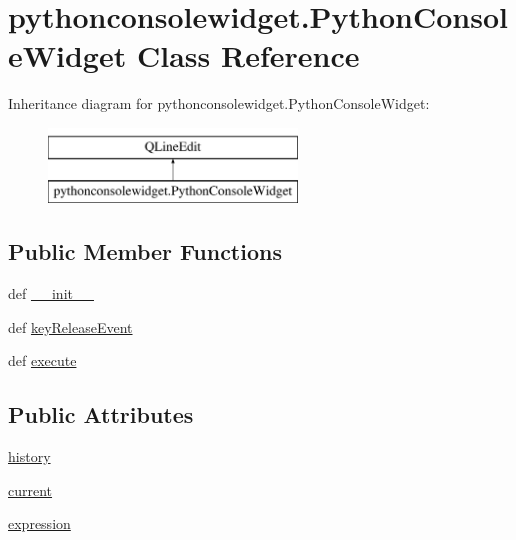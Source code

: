 \hypertarget{classpythonconsolewidget_1_1PythonConsoleWidget}{}\section{pythonconsolewidget.\+Python\+Console\+Widget Class Reference}
\label{classpythonconsolewidget_1_1PythonConsoleWidget}
Inheritance diagram for pythonconsolewidget.\+Python\+Console\+Widget\+:\begin{figure}[H]
\begin{center}
\leavevmode
\includegraphics[height=2.000000cm]{classpythonconsolewidget_1_1PythonConsoleWidget}
\end{center}
\end{figure}
\subsection*{Public Member Functions}
\begin{DoxyCompactItemize}
\item 
def \hyperlink{classpythonconsolewidget_1_1PythonConsoleWidget_a081e10474bf5471e8db6a54aaa721596}{\+\_\+\+\_\+init\+\_\+\+\_\+}
\item 
def \hyperlink{classpythonconsolewidget_1_1PythonConsoleWidget_ae6d248f66dc7fc3417e7846cb9ac39c3}{key\+Release\+Event}
\item 
def \hyperlink{classpythonconsolewidget_1_1PythonConsoleWidget_a3cde255c5184a9918a3bc268257e5ab6}{execute}
\end{DoxyCompactItemize}
\subsection*{Public Attributes}
\begin{DoxyCompactItemize}
\item 
\hyperlink{classpythonconsolewidget_1_1PythonConsoleWidget_a7648fd3b2dd0207310acca9ae384148a}{history}
\item 
\hyperlink{classpythonconsolewidget_1_1PythonConsoleWidget_a59bd099f835f1dd66cbeca349c60b9e9}{current}
\item 
\hyperlink{classpythonconsolewidget_1_1PythonConsoleWidget_aea7825cc8aeb6678a4a3b778898bd2c8}{expression}
\end{DoxyCompactItemize}
